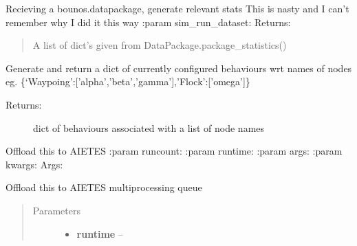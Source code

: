 \documentclass[letterpaper,10pt,english]{sphinxmanual}
\begin{document}
\begin{fulllineitems}

\begin{fulllineitems}
\label{index:polybos.Scenario.generate_run_stats}
Recieving a bounos.datapackage, generate relevant stats
This is nasty and I can't remember why I did it this way
:param sim\_run\_dataset:
Returns:
\begin{quote}

A list of dict's given from DataPackage.package\_statistics()
\end{quote}

\end{fulllineitems}


\begin{fulllineitems}
\label{index:polybos.Scenario.get_behaviour_dict}
Generate and return a dict of currently configured behaviours wrt names of nodes
eg. \{`Waypoing':{[}'alpha','beta','gamma'{]},'Flock':{[}'omega'{]}\}
\begin{description}
\item[{Returns:}] \leavevmode
dict of behaviours associated with a list of node names

\end{description}

\end{fulllineitems}


\begin{fulllineitems}
\label{index:polybos.Scenario.run}
Offload this to AIETES
:param runcount:
:param runtime:
:param args:
:param kwargs:
Args:

\end{fulllineitems}


\begin{fulllineitems}
\label{index:polybos.Scenario.run_parallel}
Offload this to AIETES multiprocessing queue
\begin{quote}\begin{description}
\item[{Parameters}] \leavevmode\begin{itemize}
\item {} 
\textbf{runtime} -- 


\end{itemize}
\end{description}
\end{quote}
\end{fulllineitems}
\end{fulllineitems}
\end{document}
